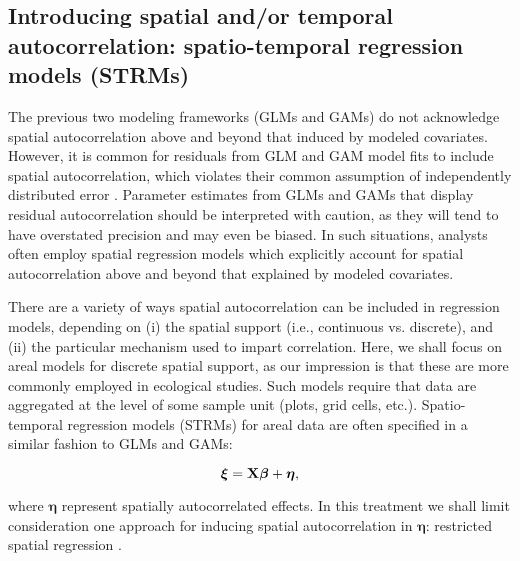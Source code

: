 \documentclass[12pt,fleqn]{article}
\begin{document}
\begin{flushleft}
\subsection{Introducing spatial and/or temporal autocorrelation: spatio-temporal regression models (STRMs)}

The previous two modeling frameworks (GLMs and GAMs) do not acknowledge spatial autocorrelation above and beyond that induced
by modeled covariates.  However, it is common for residuals from GLM and GAM model fits to include spatial autocorrelation, which violates their common assumption of independently distributed error \citep{Legendre1993,LichsteinEtAl2002}.  Parameter estimates from GLMs and GAMs that display residual autocorrelation should be interpreted with caution, as they will tend to have overstated precision and may even be biased.  In such situations, analysts often employ spatial regression models which explicitly account for spatial autocorrelation above and beyond that explained by modeled covariates.

\hspace{.5in}There are a variety of ways spatial autocorrelation can be included in regression models, depending on (i) the spatial support (i.e., continuous vs. discrete), and (ii) the particular mechanism used to impart correlation.  Here, we shall focus on areal models for discrete spatial support, as our impression is that these are more commonly employed in ecological studies.  Such models require that data are aggregated at the level of some sample unit (plots, grid cells, etc.).  Spatio-temporal regression models (STRMs) for areal data are often specified in a similar fashion to GLMs and GAMs:
\begin{linenomath*}
\begin{equation}
  \label{eq:spat_reg}
  \boldsymbol{\xi}={\bf X} \boldsymbol{\beta} + \boldsymbol{\eta},
\end{equation}
\end{linenomath*}
where $\boldsymbol{\eta}$ represent spatially autocorrelated effects.  In this treatment we shall limit consideration one approach for
inducing spatial autocorrelation in $\boldsymbol{\eta}$: restricted spatial regression \citep[RSR;][]{Reich2006,Hodges2010,Hughes2013}.


\end{flushleft}
\end{document}
